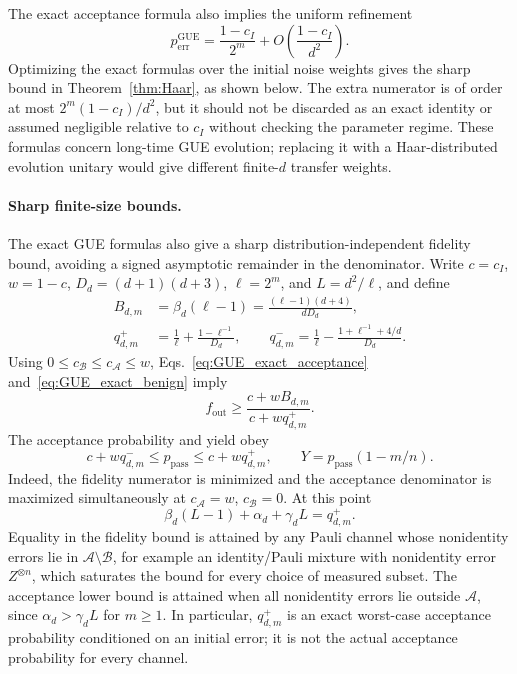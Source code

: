 \documentclass[onecolumn,prx,longbibliography,nofootinbib, superscriptaddress]{revtex4-2}
\theoremstyle{recap}
\begin{document}
The exact acceptance formula also implies the uniform refinement
\begin{equation}
    p_{\mathrm{err}}^{\mathrm{GUE}}
    =\frac{1-c_I}{2^m}+O\!\left(\frac{1-c_I}{d^2}\right).
\end{equation}
Optimizing the exact formulas over the initial noise weights gives the sharp bound in Theorem~\ref{thm:Haar}, as shown below. The extra numerator is of order at most $2^m(1-c_I)/d^2$, but it should not be discarded as an exact identity or assumed negligible relative to $c_I$ without checking the parameter regime. These formulas concern long-time GUE evolution; replacing it with a Haar-distributed evolution unitary would give different finite-$d$ transfer weights.


\paragraph{Sharp finite-size bounds.}
The exact GUE formulas also give a sharp distribution-independent fidelity bound, avoiding a signed asymptotic remainder in the denominator. Write $c=c_I$, $w=1-c$, $D_d=(d+1)(d+3)$, $\ell=2^m$, and $L=d^2/\ell$, and define
\begin{equation}\label{eq:GUE_explicit_probabilities}
\begin{split}
    B_{d,m}&=\beta_d(\ell-1)=\frac{(\ell-1)(d+4)}{dD_d},\\
    q^+_{d,m}&=\frac1\ell+\frac{1-\ell^{-1}}{D_d},\qquad
    q^-_{d,m}=\frac1\ell-\frac{1+\ell^{-1}+4/d}{D_d}.
\end{split}
\end{equation}
Using $0\leq c_{\mathcal B}\leq c_{\mathcal A}\leq w$, Eqs.~\eqref{eq:GUE_exact_acceptance} and~\eqref{eq:GUE_exact_benign} imply
\begin{equation}\label{eq:GUE_sharp_bound_appendix}
    f_{\mathrm{out}}\geq\frac{c+wB_{d,m}}{c+wq^+_{d,m}}.
\end{equation}
The acceptance probability and yield obey
\begin{equation}\label{eq:GUE_acceptance_bounds}
    c+wq^-_{d,m}\leq p_{\mathrm{pass}}\leq c+wq^+_{d,m},\qquad
    Y=p_{\mathrm{pass}}(1-m/n).
\end{equation}
Indeed, the fidelity numerator is minimized and the acceptance denominator is maximized simultaneously at $c_{\mathcal A}=w$, $c_{\mathcal B}=0$. At this point
\begin{equation}
    \beta_d(L-1)+\alpha_d+\gamma_dL=q^+_{d,m}.
\end{equation}
Equality in the fidelity bound is attained by any Pauli channel whose nonidentity errors lie in $\mathcal A\setminus\mathcal B$, for example an identity/Pauli mixture with nonidentity error $Z^{\otimes n}$, which saturates the bound for every choice of measured subset. The acceptance lower bound is attained when all nonidentity errors lie outside $\mathcal A$, since $\alpha_d>\gamma_dL$ for $m\geq1$. In particular, $q^+_{d,m}$ is an exact worst-case acceptance probability conditioned on an initial error; it is not the actual acceptance probability for every channel.
\end{document}
